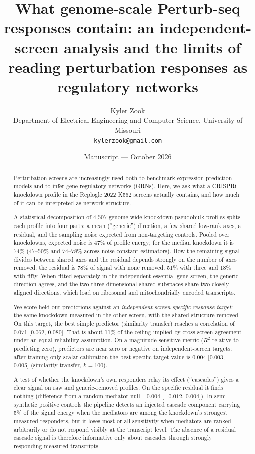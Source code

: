 \documentclass[10pt]{article}
\title{\vspace{-1.2em}\textbf{What genome-scale Perturb-seq responses contain: an independent-screen analysis and the limits of reading perturbation responses as regulatory networks}}
\author{Kyler Zook\\\small Department of Electrical Engineering and Computer Science, University of Missouri\\\small\texttt{kylerzook@gmail.com}}
\date{\small Manuscript --- October 2026}
\begin{document}
\maketitle
\vspace{-1em}
\begin{abstract}
\noindent
Perturbation screens are increasingly used both to benchmark expression-prediction models and to infer gene regulatory networks (GRNs). Here, we ask what a CRISPRi knockdown profile in the Replogle 2022 K562 screens actually contains, and how much of it can be interpreted as network structure.

A statistical decomposition of 4{,}507 genome-wide knockdown pseudobulk profiles splits each profile into four parts: a mean (``generic'') direction, a few shared low-rank axes, a residual, and the sampling noise expected from non-targeting controls.
Pooled over knockdowns, expected noise is 47\% of profile energy; for the median knockdown it is 74\% (47--50\% and 74--78\% across noise-constant estimators).
How the remaining signal divides between shared axes and the residual depends strongly on the number of axes removed: the residual is 78\% of signal with none removed, 51\% with three and 18\% with fifty.
When fitted separately in the independent essential-gene screen, the generic direction agrees, and the two three-dimensional shared subspaces share two closely aligned directions, which load on ribosomal and mitochondrially encoded transcripts.

We score held-out predictions against an \emph{independent-screen specific-response target}: the same knockdown measured in the other screen, with the shared structure removed. On this target, the best simple predictor (similarity transfer) reaches a correlation of 0.071 [0.062, 0.080]. That is about 11\% of the ceiling implied by cross-screen agreement under an equal-reliability assumption. On a magnitude-sensitive metric ($R^2$ relative to predicting zero), predictors are near zero or negative on independent-screen targets; after training-only scalar calibration the best specific-target value is 0.004 [0.003, 0.005] (similarity transfer, $k=100$).

A test of whether the knockdown's own responders relay its effect (``cascades'') gives a clear signal on raw and generic-removed profiles. On the specific residual it finds nothing (difference from a random-mediator null $-0.004$ [$-0.012$, $0.004$]). In semi-synthetic positive controls the pipeline detects an injected cascade component carrying 5\% of the signal energy when the mediators are among the knockdown's strongest measured responders, but it loses most or all sensitivity when mediators are ranked arbitrarily or do not respond visibly at the transcript level. The absence of a residual cascade signal is therefore informative only about cascades through strongly responding measured transcripts.


\end{abstract}
\end{document}
